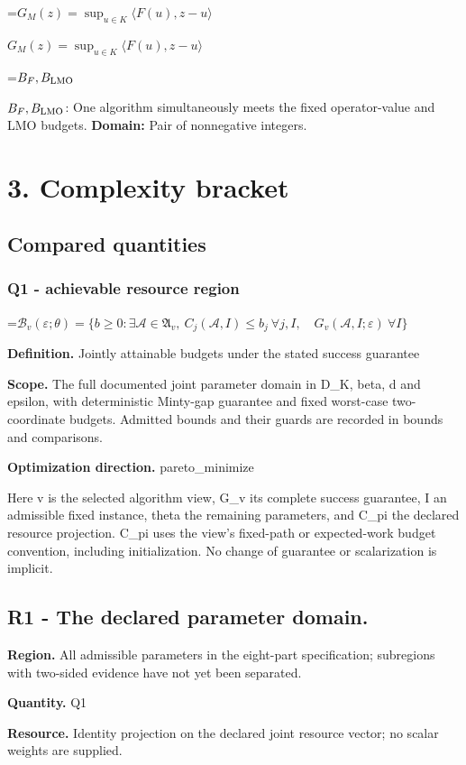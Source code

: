 \documentclass[10pt,a4paper]{article}
\newcommand{\AtlasMath}[1]{\par\begingroup\centering\setbox0=\hbox{$\displaystyle #1$}\ifdim\wd0>1.4\linewidth\typeout{ATLAS WIDE FORMULA: \the\wd0}\fi\ifdim\wd0>\linewidth\resizebox{\linewidth}{!}{\box0}\else\box0\fi\par\endgroup}
\newcommand{\AtlasInlineMath}[1]{\begingroup\setbox0=\hbox{$#1$}\ifdim\wd0>.4\linewidth\endgroup\AtlasMath{#1}\else\endgroup$#1$\fi}
\begin{document}
\AtlasInlineMath{G_M(z)=\sup_{u\in K}\langle F(u),z-u\rangle}

\AtlasInlineMath{B_F,B_{\rm LMO}}: One algorithm simultaneously meets the fixed operator-value and LMO budgets. \textbf{Domain:} Pair of nonnegative integers.

\section{3. Complexity bracket}
\subsection{Compared quantities}
\subsubsection{Q1 - achievable resource region}
\AtlasMath{\mathcal B_v(\varepsilon;\theta)=\{b\ge0:\exists\mathcal A\in\mathfrak A_v,\ C_j(\mathcal A,I)\le b_j\ \forall j,I,\quad G_v(\mathcal A,I;\varepsilon)\ \forall I\}}
\textbf{Definition.} Jointly attainable budgets under the stated success guarantee

\textbf{Scope.} The full documented joint parameter domain in D\_\allowbreak{}K, beta, d and epsilon, with deterministic Minty-gap guarantee and fixed worst-case two-coordinate budgets. Admitted bounds and their guards are recorded in bounds and comparisons.

\textbf{Optimization direction.} pareto\_\allowbreak{}minimize

Here v is the selected algorithm view, G\_\allowbreak{}v its complete success guarantee, I an admissible fixed instance, theta the remaining parameters, and C\_\allowbreak{}pi the declared resource projection. C\_\allowbreak{}pi uses the view's fixed-path or expected-work budget convention, including initialization. No change of guarantee or scalarization is implicit.

\subsection{R1 - The declared parameter domain.}
\textbf{Region.} All admissible parameters in the eight-part specification; subregions with two-sided evidence have not yet been separated.

\textbf{Quantity.} Q1

\textbf{Resource.} Identity projection on the declared joint resource vector; no scalar weights are supplied.
\end{document}
